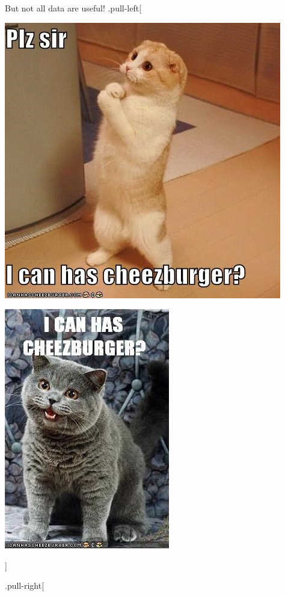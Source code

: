 \documentclass[
  ignorenonframetext,
]{beamer}
\begin{document}
\begin{frame}{But not all data are useful!}
\protect\hypertarget{but-not-all-data-are-useful}{}
.pull-left{[}

\begin{center}\includegraphics[width=0.6\linewidth]{figures/cheezeburger} \end{center}

\begin{center}\includegraphics[width=0.6\linewidth]{figures/cheezeburger2} \end{center}

{]}

.pull-right{[}


\end{frame}
\end{document}
